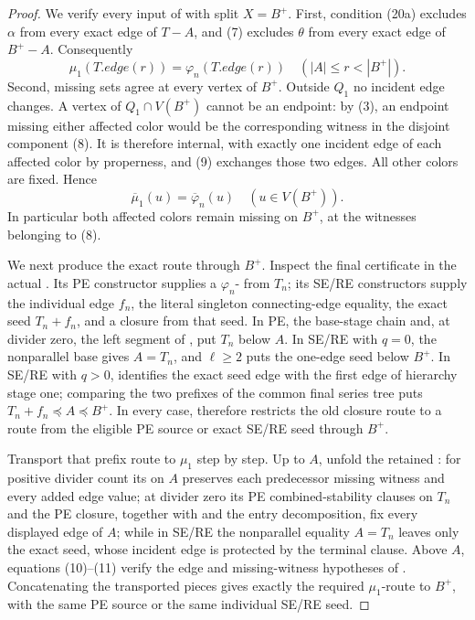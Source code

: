 \begin{proof}
We verify every input of
 with split \(X=B^+\).  First,
condition (20a) excludes \(\alpha\) from every exact edge of \(T-A\),
and (7) excludes \(\theta\) from every exact edge of \(B^+-A\).
Consequently
\[
 \mu_1(T.\mathit{edge}(r))=\varphi_n(T.\mathit{edge}(r))
       \quad(|A|\le r<|B^+|).                               \tag{10}
\]
Second, missing sets agree at every vertex of \(B^+\).  Outside \(Q_1\)
no incident edge changes.  A vertex of \(Q_1\cap V(B^+)\) cannot be an
endpoint: by (3), an endpoint missing either affected color would be the
corresponding witness in the disjoint component (8).  It is therefore
internal, with exactly one incident edge of each affected color by
properness, and (9) exchanges those two edges.  All other colors are
fixed.  Hence
\[
 \overline\mu_1(u)=\overline\varphi_n(u)
                 \quad(u\in V(B^+)).                        \tag{11}
\]
In particular both affected colors remain missing on \(B^+\), at the
witnesses belonging to (8).

We next produce the exact route through \(B^+\).  Inspect the final
certificate in the actual .  Its PE constructor
supplies a \(\varphi_n\)- from \(T_n\); its
SE/RE constructors supply the individual edge \(f_n\), the literal
singleton connecting-edge equality, the exact
 seed \(T_n+f_n\), and a closure from
that seed.  In PE, the base-stage chain and, at divider zero, the left
segment of , put \(T_n\) below \(A\).  In
SE/RE with \(q=0\), the nonparallel base gives \(A=T_n\), and
\(\ell\ge2\) puts the one-edge seed below \(B^+\).  In SE/RE with
\(q>0\),  identifies the exact
seed edge with the first edge of hierarchy stage one; comparing the two
prefixes of the common final series tree puts
\(T_n+f_n\preccurlyeq A\preccurlyeq B^+\).  In every case,
 therefore restricts the
old closure route to a route from the eligible PE source or exact SE/RE
seed through \(B^+\).

Transport that prefix route to \(\mu_1\) step by step.  Up to \(A\),
unfold the retained : for positive
divider count its  on \(A\) preserves
each predecessor missing witness and every added edge value; at divider
zero its PE combined-stability clauses on \(T_n\) and the PE closure,
together with  and the
 entry decomposition, fix every displayed edge
of \(A\); while in SE/RE the nonparallel equality \(A=T_n\) leaves only
the exact seed, whose incident edge is protected by the terminal
 clause.  Above \(A\), equations (10)--(11)
verify the edge and missing-witness hypotheses of
.  Concatenating
the transported pieces gives exactly the required \(\mu_1\)-route to
\(B^+\), with the same PE source or the same individual SE/RE seed.


\end{proof}

